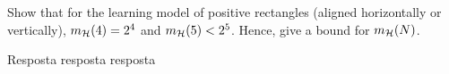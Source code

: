 \begin{enunciado}{2}
    Show that for the learning model of positive rectangles (aligned horizontally or vertically), $m_{\mathcal{H}}(4) = 2^4$ and $m_{\mathcal{H}}(5) < 2^5$. Hence, give a bound for $m_{\mathcal{H}}(N)$.
\end{enunciado}

Resposta resposta resposta